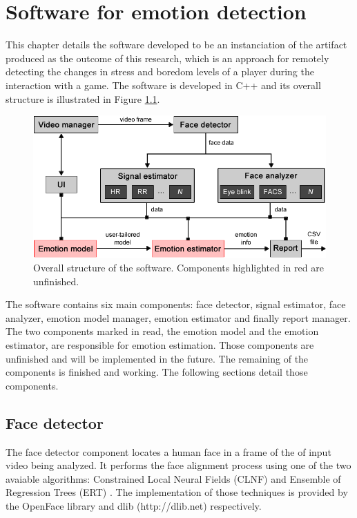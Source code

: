 \chapter{Software for emotion detection}
\label{ch:software}

This chapter details the software developed to be an instanciation of the artifact produced as the outcome of this research, which is an approach for remotely detecting the changes in stress and boredom levels of a player during the interaction with a game. The software is developed in C++ and its overall structure is illustrated in Figure \ref{fig:tool-overall-structure}.

\begin{figure}[h]
    \centering
    \includegraphics[width=\textwidth]{figures/tool-overall-structure.png}
    \caption{Overall structure of the software. Components highlighted in red are unfinished.}
    \label{fig:tool-overall-structure}
\end{figure}

The software contains six main components: face detector, signal estimator, face analyzer, emotion model manager, emotion estimator and finally report manager. The two components marked in read, the emotion model and the emotion estimator, are responsible for emotion estimation. Those components are unfinished and will be implemented in the future. The remaining of the components is finished and working. The following sections detail those components.

\section{Face detector}

The face detector component locates a human face in a frame of the of input video being analyzed. It performs the face alignment process using one of the two avaiable algorithms: Constrained Local Neural Fields (CLNF) \parencite{baltrusaitis2013constrained} and Ensemble of Regression Trees (ERT) \parencite{kazemi2014one}. The implementation of those techniques is provided by the OpenFace library \parencite{baltruvsaitis2016openface} and dlib (http://​dlib.​net) respectively.


